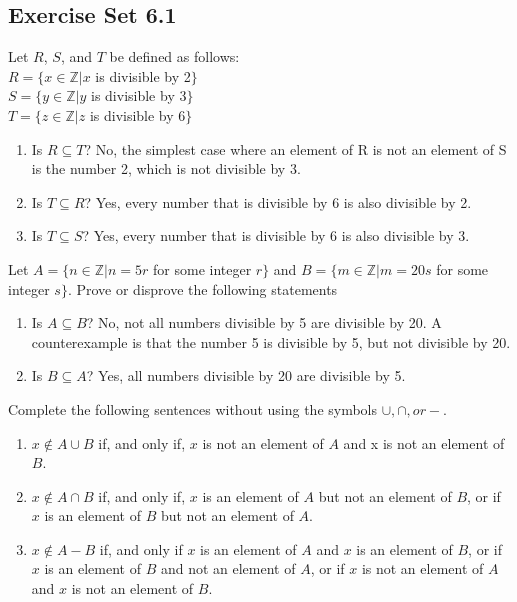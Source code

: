 \documentclass[12pt]{article}
\newenvironment{modenumerate}
  {\enumerate\setupmodenumerate}
  {\endenumerate}
\newif\ifmoditem
\newcommand{\setupmodenumerate}{%
  \global\moditemfalse
  \let\origmakelabel\makelabel
  \def\moditem##1{\global\moditemtrue\def\mesymbol{##1}\item}%
  \def\makelabel##1{%
    \origmakelabel{##1\ifmoditem\rlap{\mesymbol}\fi\enspace}%
    \global\moditemfalse}%
}
\begin{document}

\setcounter{section}{6}
\subsection{Exercise Set 6.1}
\begin{modenumerate}

\setcounter{enumi}{2}
\item %
Let $R$, $S$, and $T$ be defined as follows:\\
$R  = \{x \in \mathbb{Z} | x$ is divisible by 2$\}$\\
$S = \{y \in \mathbb{Z} | y$ is divisible by 3$\}$\\
$T = \{z \in \mathbb{Z} | z$ is divisible by 6$\}$\\
\begin{enumerate}
\item Is $R\subseteq T$? No, the simplest case where an element of R is not an element of S is the number
  2, which is not divisible by 3.
\item Is $T \subseteq R$? Yes, every number that is divisible by 6 is also divisible by 2.
\item Is $T \subseteq S$? Yes, every number that is divisible by 6 is also divisible by 3.
\end{enumerate}

\setcounter{enumi}{4}
\item %
Let $A = \{n \in \mathbb{Z} | n = 5r $ for some integer $r\}$ and $B = \{m \in \mathbb{Z} | m = 20s$ for some
integer $s \}$. Prove or disprove the following statements
\begin{enumerate}
\item Is $A \subseteq B$? No, not all numbers divisible by 5 are divisible by 20. A counterexample is that the
  number 5 is divisible by 5, but not divisible by 20.
\item Is $B \subseteq A$? Yes, all numbers divisible by 20 are divisible by 5.
\end{enumerate}

\setcounter{enumi}{8}
\item %
Complete the following sentences without using the symbols $\cup, \cap, or -$.
\begin{enumerate}
\item $x \not\in A \cup B$ if, and only if, $x$ is not an element of $A$ and x is not an element of $B$.
\item $x \not\in A \cap B$ if, and only if, $x$ is an element of $A$ but not an element of $B$, or if $x$ is
  an element of $B$ but not an element of $A$.
\item $x \not\in A - B$ if, and only if $x$ is an element of $A$ and $x$ is an element of $B$, or if $x$ is an
  element of $B$ and not an element of $A$, or if $x$ is not an element of $A$ and $x$ is not an element of
  $B$.
\end{enumerate}
\setcounter{enumi}{15}
\moditem{*} %

\setcounter{enumi}{18}
\item %
\setcounter{enumi}{21}
\item %
\end{modenumerate}
\end{document}
